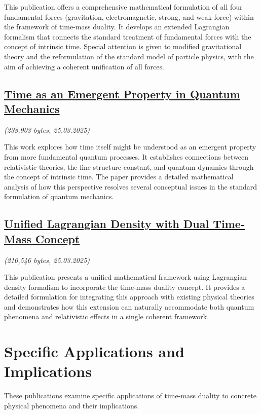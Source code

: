 \documentclass[a4paper,12pt]{article}
\newcommand{\repobase}{https://github.com/jpascher/T0-Time-Mass-Duality/tree/main/2/}
\begin{document}
	This publication offers a comprehensive mathematical formulation of all four fundamental forces (gravitation, electromagnetic, strong, and weak force) within the framework of time-mass duality. It develops an extended Lagrangian formalism that connects the standard treatment of fundamental forces with the concept of intrinsic time. Special attention is given to modified gravitational theory and the reformulation of the standard model of particle physics, with the aim of achieving a coherent unification of all forces.
	
	\subsection{\href{\repobase pdf/English/Time as an Emergent Property in Quantum Mechanics.pdf}{Time as an Emergent Property in Quantum Mechanics}}
	\textit{(238,903 bytes, 25.03.2025)}
	
	This work explores how time itself might be understood as an emergent property from more fundamental quantum processes. It establishes connections between relativistic theories, the fine structure constant, and quantum dynamics through the concept of intrinsic time. The paper provides a detailed mathematical analysis of how this perspective resolves several conceptual issues in the standard formulation of quantum mechanics.
	
	\subsection{\href{\repobase pdf/English/Unified Lagrangian Density with Dual Time-Mass Concept.pdf}{Unified Lagrangian Density with Dual Time-Mass Concept}}
	\textit{(210,546 bytes, 25.03.2025)}
	
	This publication presents a unified mathematical framework using Lagrangian density formalism to incorporate the time-mass duality concept. It provides a detailed formulation for integrating this approach with existing physical theories and demonstrates how this extension can naturally accommodate both quantum phenomena and relativistic effects in a single coherent framework.
	
	\section{Specific Applications and Implications}
	
	These publications examine specific applications of time-mass duality to concrete physical phenomena and their implications.
	
\end{document}
